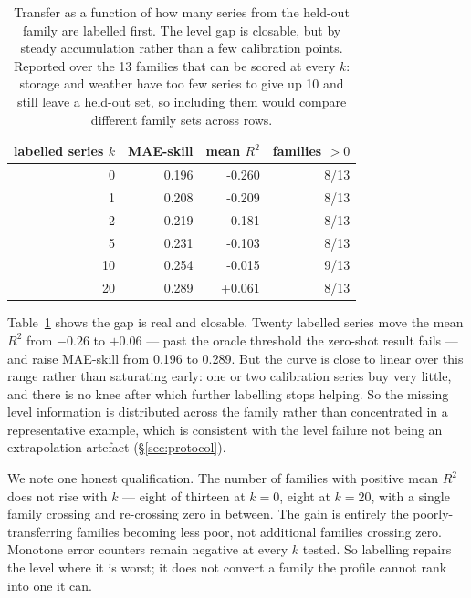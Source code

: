 \documentclass[11pt,a4paper]{article}
\newcommand{\num}[1]{#1}
\begin{document}
\begin{table}[t]
\centering
\caption{Transfer as a function of how many series from the held-out family are
labelled first. The level gap is closable, but by steady accumulation rather
than a few calibration points. Reported over the \num{13} families that can be
scored at every \(k\): storage and weather have too few series to give up
\num{10} and still leave a held-out set, so including them would compare
different family sets across rows.}
\label{tab:fewshot}
\small
\begin{tabular}{rrrr}
\toprule
labelled series \(k\) & MAE-skill & mean \(R^2\) & families \(>0\) \\
\midrule
0  & \num{0.196} & \num{-0.260} & 8/13 \\
1  & \num{0.208} & \num{-0.209} & 8/13 \\
2  & \num{0.219} & \num{-0.181} & 8/13 \\
5  & \num{0.231} & \num{-0.103} & 8/13 \\
10 & \num{0.254} & \num{-0.015} & 9/13 \\
20 & \num{0.289} & \num{+0.061} & 8/13 \\
\bottomrule
\end{tabular}
\end{table}

Table~\ref{tab:fewshot} shows the gap is real and closable. Twenty labelled
series move the mean \(R^2\) from \(-0.26\) to \(+0.06\) --- past the oracle
threshold the zero-shot result fails --- and raise MAE-skill from \num{0.196} to
\num{0.289}. But the curve is close to linear over this range rather than
saturating early: one or two calibration series buy very little, and there is no
knee after which further labelling stops helping. So the missing level
information is distributed across the family rather than concentrated in a
representative example, which is consistent with the level failure not being an
extrapolation artefact (\S\ref{sec:protocol}).

We note one honest qualification. The number of families with positive mean
\(R^2\) does not rise with \(k\) --- eight of thirteen at \(k=0\), eight at
\(k=20\), with a single family crossing and re-crossing zero in between. The
gain is entirely the poorly-transferring families becoming less poor, not
additional families crossing zero. Monotone error counters remain negative at
every \(k\) tested. So labelling repairs the level where it is worst; it does
not convert a family the profile cannot rank into one it can.
\end{document}
